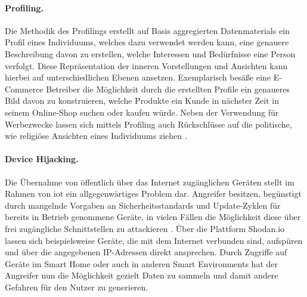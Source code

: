 
\paragraph{Profiling.}
\label{sec:Grundlagen:para:Profiling}
Die Methodik des Profilings erstellt auf Basis aggregierten Datenmaterials ein Profil eines Individuums, welches dazu verwendet werden kann, eine genauere Beschreibung davon zu erstellen, welche Interessen und Bedürfnisse eine Person verfolgt. Diese Repräsentation der inneren Vorstellungen und Ansichten kann hierbei auf unterschiedlichen Ebenen ansetzen. Exemplarisch besäße eine E-Commerce Betreiber die Möglichkeit durch die erstellten Profile ein genaueres Bild davon zu konstruieren, welche Produkte ein Kunde in nächster Zeit in seinem Online-Shop suchen oder kaufen würde.
Neben der Verwendung für Werbezwecke lassen sich mittels Profiling auch Rückschlüsse auf die politische, wie religiöse Ansichten eines Individuums ziehen \cite{Seliem2018}. 


\paragraph{Device Hijacking.}
\label{sec:Grundlagen:para:Device Hijacking}
Die Übernahme von öffentlich über das Internet zugänglichen Geräten stellt im Rahmen von \ac{iot} ein allgegenwärtiges Problem dar. Angreifer besitzen, begünstigt durch mangelnde Vorgaben an Sicherheitsstandards und Update-Zyklen für bereits in Betrieb genommene Geräte, in vielen Fällen die Möglichkeit diese über frei zugängliche Schnittstellen zu attackieren \cite{SecPrivSmartCity2021}. Über die Plattform Shodan.io lassen sich beispielsweise Geräte, die mit dem Internet verbunden sind, aufspüren und über die angegebenen IP-Adressen direkt ansprechen. Durch Zugriffe auf Geräte im Smart Home oder auch in anderen Smart Environments hat der Angreifer nun die Möglichkeit gezielt Daten zu sammeln und damit andere Gefahren für den Nutzer zu generieren. 


